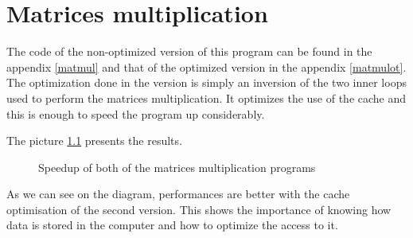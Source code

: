 \chapter{Matrices multiplication}

The code of the non-optimized version of this program can be found in the appendix \ref{matmul} and that of the optimized version in the appendix \ref{matmulot}. 
The optimization done in the version is simply an inversion of the two inner loops used to perform the matrices multiplication. It optimizes the use of the cache and this is enough to speed the program up considerably.

The picture \ref{matmul_pic} presents the results.

\begin{figure}[h]
  \begin{center}
  \end{center}
  \caption{Speedup of both of the matrices multiplication programs}
  \label{matmul_pic}
\end{figure}

As we can see on the diagram, performances are better with the cache optimisation of the second version. This shows the importance of knowing how data is stored in the computer and how to optimize the access to it.

